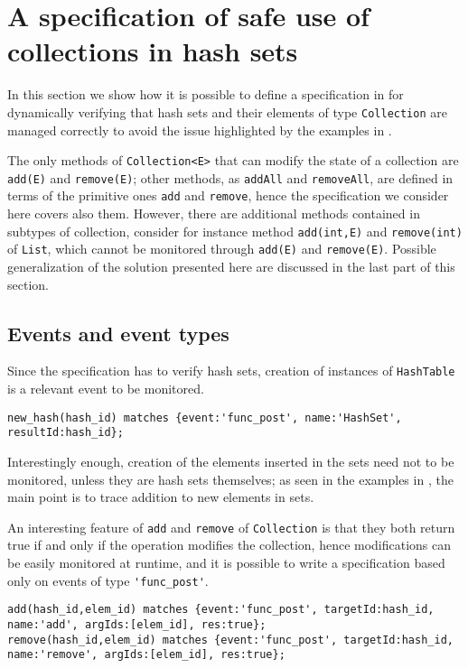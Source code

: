 \section{A specification of safe use of collections in hash sets}
In this section we show how it is possible to define a specification in \rml for dynamically verifying that hash sets and their elements of
type \lstinline{Collection} are managed correctly to avoid the issue highlighted by the examples in .

The only methods of \lstinline{Collection<E>} that can modify the state of a collection are \lstinline{add(E)} and \lstinline{remove(E)}; other methods, as \lstinline{addAll} and \lstinline{removeAll}, are defined in terms of the primitive ones \lstinline{add} and \lstinline{remove}, hence the specification we consider here covers also them. However, there are additional methods contained in subtypes of collection, consider for instance method
\lstinline{add(int,E)} and \lstinline{remove(int)} of \lstinline{List}, which cannot be monitored through \lstinline{add(E)} and \lstinline{remove(E)}. Possible generalization of the solution presented here are discussed in the last part of this section.

\subsection*{Events and event types} Since the specification has to verify hash sets, creation of instances of \lstinline{HashTable} is a relevant event
to be monitored.
\begin{lstlisting}[basicstyle=\ttfamily\scriptsize]
new_hash(hash_id) matches {event:'func_post', name:'HashSet', resultId:hash_id};
\end{lstlisting}
Interestingly enough, creation of the elements inserted in the sets need not to be monitored, unless they are hash sets themselves;
as seen in the examples in , the main point is to trace addition to new elements in sets.

An interesting feature of \lstinline{add} and \lstinline{remove} of \lstinline{Collection} is that they both return true if and only if the operation modifies the collection, hence modifications can be easily monitored at runtime, and it is possible to write a specification based only on events of type \lstinline{'func_post'}.

\begin{lstlisting}[basicstyle=\ttfamily\scriptsize]
add(hash_id,elem_id) matches {event:'func_post', targetId:hash_id, name:'add', argIds:[elem_id], res:true};
remove(hash_id,elem_id) matches {event:'func_post', targetId:hash_id, name:'remove', argIds:[elem_id], res:true};
\end{lstlisting}

